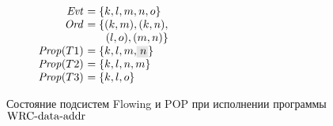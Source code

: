\begin{figure}
  \begin{subfigure}{.5\textwidth}
\begin{center}
\end{center}
    \caption{}
    \label{fig:armvpop:flpop:5}
  \end{subfigure}%
  \begin{subfigure}{.5\textwidth}
\begin{center}
\parbox{63mm}{$\begin{array}{@{}r@{~}l@{}}
  \Evt      &= \{k, l, m, n, o\} \\
  \Ord      &= \{ (k, m), (k, n), \\
            & ~~\quad (l, o), (m, n) \} \\
  \Prop(T1) &= \{k, l, m, \graybox{n} \} \\
  \Prop(T2) &= \{k, l, n, m\} \\
  \Prop(T3) &= \{k, l, o\} \\
\end{array}$}
\end{center}
    \caption{}
    \label{fig:armvpop:flpop:6}
  \end{subfigure}
  \caption{Состояние подсистем Flowing и POP при исполнении программы ${\rm WRC\text{-}data\text{-}addr}$}
\end{figure}

